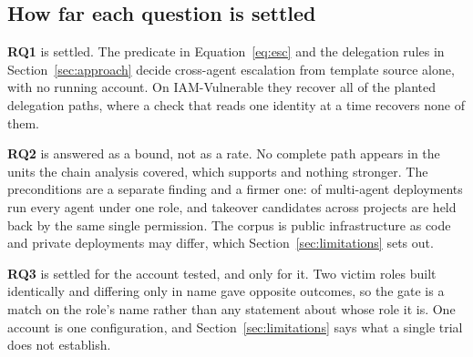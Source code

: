 \subsection{How far each question is settled}

\textbf{RQ1} is settled. The predicate in Equation~\ref{eq:esc} and the
delegation rules in Section~\ref{sec:approach} decide cross-agent escalation
from template source alone, with no running account. On IAM-Vulnerable they
recover all \nIVPaths of the planted delegation paths, where a check that
reads one identity at a time recovers none of them.

\textbf{RQ2} is answered as a bound, not as a rate. No complete path appears
in the \nChainDenominator units the chain analysis covered, which supports
\chainBound and nothing stronger. The preconditions are a separate finding
and a firmer one: \nSharedRoleRuntimes of \nMultiAgentRuntimes multi-agent
deployments run every agent under one role, and \nBlocked takeover candidates
across \nBlockedConfigs projects are held back by the same single permission.
The corpus is public infrastructure as code and private deployments may differ,
which Section~\ref{sec:limitations} sets out.

\textbf{RQ3} is settled for the account tested, and only for it. Two victim
roles built identically and differing only in name gave opposite outcomes, so
the gate is a match on the role's name rather than any statement about whose
role it is. One account is one configuration, and Section~\ref{sec:limitations}
says what a single trial does not establish.
